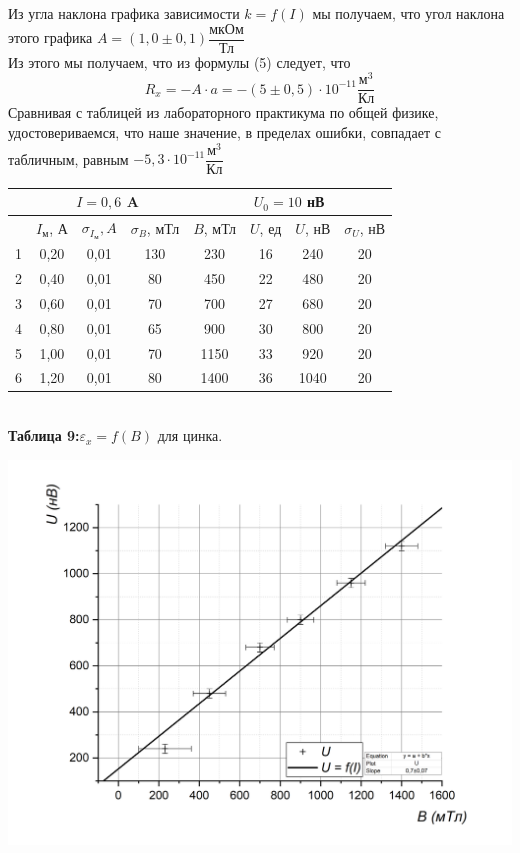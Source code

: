 \documentclass[a4paper, 12pt]{article}%
\begin{document}
Из угла наклона графика зависимости $k = f(I)$ мы получаем, что угол наклона этого графика $A = (1,0 \pm 0,1) \dfrac{\text{мкОм}}{\text{Тл}}$\\
Из этого мы получаем, что из формулы (5) следует, что 
\[R_x = -A \cdot a = -(5 \pm 0,5) \cdot 10^{-11} \dfrac{\text{м}^3}{\text{Кл}}\]
Сравнивая с таблицей из лабораторного практикума по общей физике, удостовериваемся, что наше значение, в пределах ошибки, совпадает с табличным, равным $-5,3 \cdot 10^{-11} \dfrac{\text{м}^3}{\text{Кл}}$
\begin{center}
\begin{tabular}{|c|c|c|c|c|c|c|c|}
\hline
 & \multicolumn{3}{c|}{$I = 0,6$ A} & \multicolumn{4}{c|}{$U_0 = 10$ нВ} \\ \hline
 & $I_{\text{м}}$, А & $\sigma_{I_{\text{м}}}, A$ & $\sigma_B$, мТл & $B$, мТл & $U$, ед & $U$, нВ & $\sigma_{U}$, нВ \\ \hline
1 & 0,20 & 0,01 & 130 & 230 & 16 & 240 & 20 \\ \hline
2 & 0,40 & 0,01 & 80 & 450 & 22 & 480 & 20 \\ \hline
3 & 0,60 & 0,01 & 70 & 700 & 27 & 680 & 20 \\ \hline
4 & 0,80 & 0,01 & 65 & 900 & 30 & 800 & 20 \\ \hline
5 & 1,00 & 0,01 & 70 & 1150 & 33 & 920 & 20 \\ \hline
6 & 1,20 & 0,01 & 80 & 1400 & 36 & 1040 & 20 \\ \hline
\end{tabular}\\
\textbf{Таблица 9:}$\varepsilon_x = f(B)$ для цинка.
\end{center}
\includegraphics[width = \textwidth]{4.jpg}\\
\end{document}
